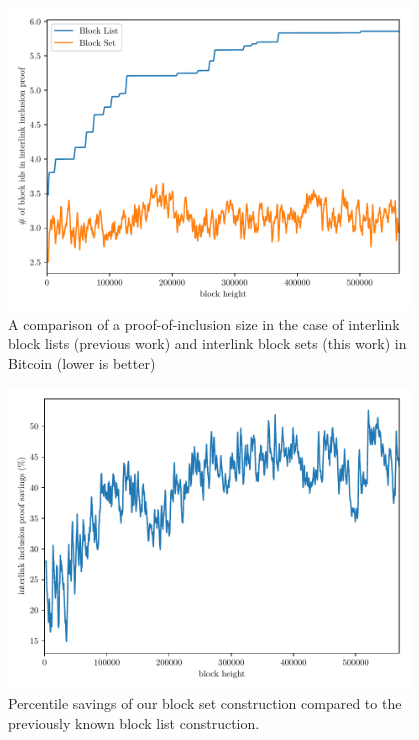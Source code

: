 \begin{figure}[h]
\begin{center}
  \includegraphics[width=0.95\textwidth]{figures/interlink-proof-list-vs-set.pdf}
  \caption{A comparison of a proof-of-inclusion size in the case of interlink block lists (previous work) and interlink block sets (this work) in Bitcoin (lower is better)}
  \label{fig.set-list-proof-comparison}
  \end{center}
\end{figure}

\begin{figure}[h]
\begin{center}
  \includegraphics[width=0.95\textwidth]{figures/interlink-proof-savings-from-blockset.pdf}
  \caption{Percentile savings of our block set construction compared to the
           previously known block list construction.}
  \label{fig.set-list-proof-comparison}
  \end{center}
\end{figure}

